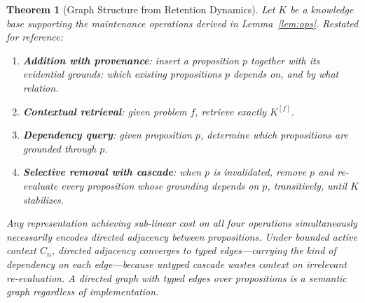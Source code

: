 \documentclass[11pt]{article}
\newtheorem{theorem}{Theorem}
\theoremstyle{definition}
\begin{document}
\begin{theorem}[Graph Structure from Retention Dynamics]
\label{thm:graph-dynamics}
Let $K$ be a knowledge base supporting the maintenance operations
derived in Lemma~\ref{lem:ops}. Restated for reference:
\begin{enumerate}
\item[(i)] \textbf{Addition with provenance}: insert a proposition $p$
   together with its evidential grounds: which existing propositions
   $p$ depends on, and by what relation.
\item[(ii)] \textbf{Contextual retrieval}: given problem $f$, retrieve
   exactly $K^{[f]}$.
\item[(iii)] \textbf{Dependency query}: given proposition $p$, determine
   which propositions are grounded through $p$.
\item[(iv)] \textbf{Selective removal with cascade}: when $p$ is
   invalidated, remove $p$ and re-evaluate every proposition whose
   grounding depends on $p$, transitively, until $K$ stabilizes.
\end{enumerate}
Any representation achieving sub-linear cost on all four operations
simultaneously necessarily encodes directed adjacency between
propositions. Under bounded active context $C_n$, directed adjacency
converges to typed edges---carrying the kind of dependency on each
edge---because untyped cascade wastes context on irrelevant
re-evaluation. A directed graph with typed edges over propositions is
a semantic graph regardless of implementation.
\end{theorem}
\end{document}
